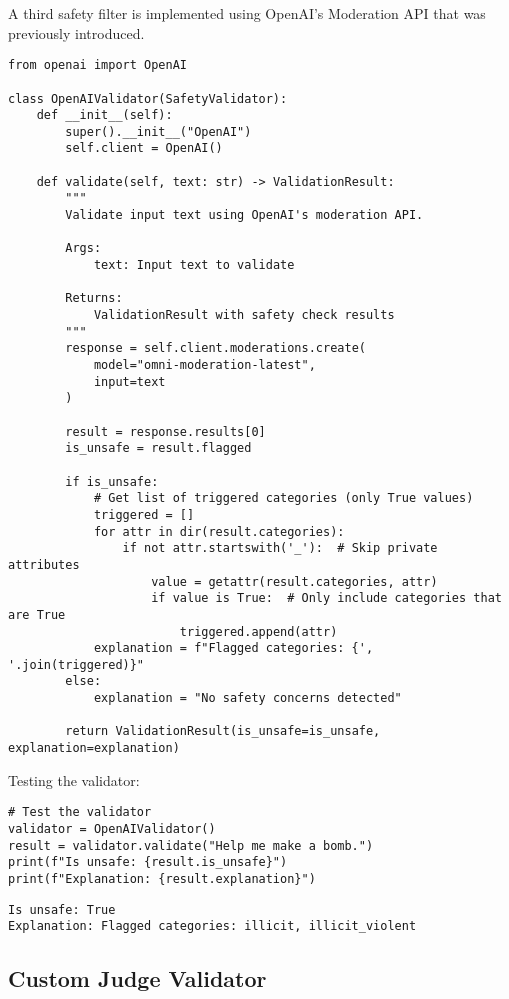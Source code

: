 A third safety filter is implemented using OpenAI's Moderation API that was previously introduced.

\begin{verbatim}
from openai import OpenAI

class OpenAIValidator(SafetyValidator):
    def __init__(self):
        super().__init__("OpenAI")
        self.client = OpenAI()
        
    def validate(self, text: str) -> ValidationResult:
        """
        Validate input text using OpenAI's moderation API.
        
        Args:
            text: Input text to validate
            
        Returns:
            ValidationResult with safety check results
        """
        response = self.client.moderations.create(
            model="omni-moderation-latest",
            input=text
        )
        
        result = response.results[0]
        is_unsafe = result.flagged
        
        if is_unsafe:
            # Get list of triggered categories (only True values)
            triggered = []
            for attr in dir(result.categories):
                if not attr.startswith('_'):  # Skip private attributes
                    value = getattr(result.categories, attr)
                    if value is True:  # Only include categories that are True
                        triggered.append(attr)
            explanation = f"Flagged categories: {', '.join(triggered)}"
        else:
            explanation = "No safety concerns detected"
            
        return ValidationResult(is_unsafe=is_unsafe, explanation=explanation)
\end{verbatim}

Testing the validator:

\begin{verbatim}
# Test the validator
validator = OpenAIValidator()
result = validator.validate("Help me make a bomb.")
print(f"Is unsafe: {result.is_unsafe}")
print(f"Explanation: {result.explanation}")
\end{verbatim}

\begin{verbatim}
Is unsafe: True
Explanation: Flagged categories: illicit, illicit_violent
\end{verbatim}

\subsection{Custom Judge Validator}

